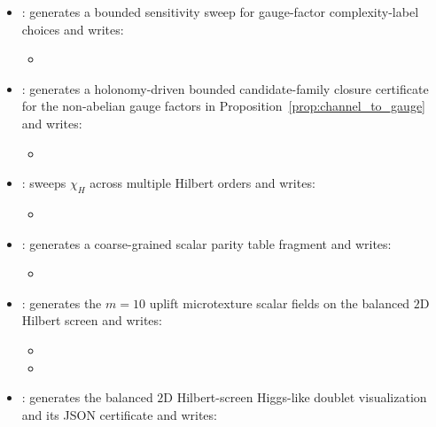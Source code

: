 \begin{sloppypar}
\begin{itemize}
\begin{itemize}
\item {}
\item {}
\end{itemize}
\item {}: generates a bounded sensitivity sweep for gauge-factor complexity-label choices and writes:
\begin{itemize}
\item {}
\end{itemize}
\item {}: generates a holonomy-driven bounded candidate-family closure certificate for the non-abelian gauge factors in Proposition~\ref{prop:channel_to_gauge} and writes:
\begin{itemize}
\item {}
\end{itemize}
\item {}: sweeps $\chi_H$ across multiple Hilbert orders and writes:
\begin{itemize}
\item {}
\end{itemize}
\item {}: generates a coarse-grained scalar parity table fragment and writes:
\begin{itemize}
\item {}
\end{itemize}
\item {}: generates the $m=10$ uplift microtexture scalar fields on the balanced $2$D Hilbert screen and writes:
\begin{itemize}
\item {}
\item {}
\end{itemize}
\item {}: generates the balanced $2$D Hilbert-screen Higgs-like doublet visualization and its JSON certificate and writes:

\end{itemize}
\end{sloppypar}
